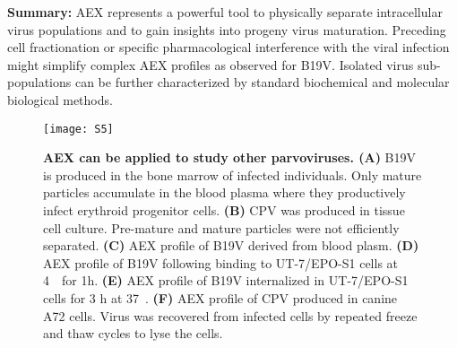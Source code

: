 \medskip
\textbf{Summary:} AEX represents a powerful tool to physically separate intracellular virus populations and to gain insights into progeny virus maturation. Preceding cell fractionation or specific pharmacological interference with the viral infection might simplify complex AEX profiles as observed for B19V. Isolated virus sub-populations can be further characterized by standard biochemical and molecular biological methods.          
 






\begin{figure}
\centering
  \texttt{[image: S5]} \\[-0.2cm]
  \caption[Anion-Exchange Chromatography Performed with Other Parvoviruses]
   {\textbf{AEX can be applied to study other parvoviruses. (A)} B19V is produced in the bone marrow of infected individuals. Only mature particles accumulate in the blood plasma where they productively infect erythroid progenitor cells. \textbf{(B)} CPV was produced in tissue cell culture. Pre-mature and mature particles were not efficiently separated. \textbf{(C)} AEX profile of B19V derived from blood plasm. \textbf{(D)} AEX profile of B19V following binding to UT-7/EPO-S1 cells at \mbox{4 \textcelsius}~for 1h. \textbf{(E)} AEX profile of B19V internalized in UT-7/EPO-S1 cells for 3 h at \mbox{37 \textcelsius}.  \textbf{(F)} AEX profile of CPV produced in canine A72 cells. Virus was recovered from infected cells by repeated freeze and thaw cycles to lyse the cells.} 
\label{S5}
\end{figure}





    




\renewcommand\thefigure{\thechapter.\arabic{figure}} 

